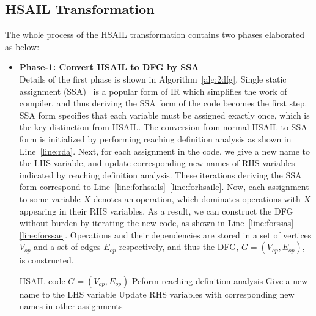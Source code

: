 \subsection{HSAIL Transformation}
\label{sec:trans}
The whole process of the HSAIL transformation contains two phases elaborated as below:
\begin{itemize}
    \item \textbf{Phase-1: Convert HSAIL to DFG by SSA} \\\indent
        Details of the first phase is shown in Algorithm~\ref{alg:2dfg}.
        Single static assignment (SSA)~\cite{ssa} is a popular form of IR which simplifies the work of compiler, 
        and thus deriving the SSA form of the code becomes the first step.
        SSA form specifies that each variable must be assigned exactly once, which is the key distinction from HSAIL.
        The conversion from normal HSAIL to SSA form is initialized by performing reaching definition analysis \cite{rda} as shown in Line~\ref{line:rda}.
        Next, for each assignment in the code, we give a new name to the LHS variable, and update corresponding new names of RHS variables indicated by reaching definition analysis.
        These iterations deriving the SSA form correspond to Line~\ref{line:forhsails}--\ref{line:forhsaile}.
        Now, each assignment to some variable $X$ denotes an operation, which dominates operations with $X$ appearing in their RHS variables.
        As a result, we can construct the DFG without burden by iterating the new code, as shown in Line~\ref{line:forssas}--\ref{line:forssae}.
        Operations and their dependencies are stored in a set of vertices $V_{op}$ and a set of edges $E_{op}$ respectively, 
        and thus the DFG, $G = ( V_{op} , E_{op} )$, is constructed.
        \begin{algorithm}[ht!]    \caption{}
            \begin{algorithmic}[1]
                \Require    HSAIL code
                \Ensure     $G = ( V_{op} , E_{op} )$   
                \State      Peform reaching definition analysis     \label{line:rda}
                     \label{line:forhsails}
                \State      Give a new name to the LHS variable
                \State      Update RHS variables with corresponding new names in other assignments
                \EndFor                                                     \label{line:forhsaile}

\end{algorithmic}
\end{algorithm}
\end{itemize}
